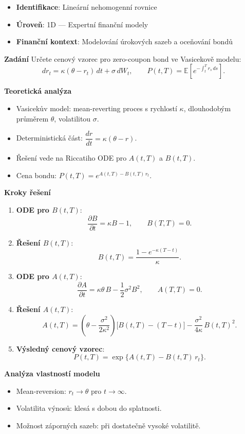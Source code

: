 \begin{example}
\label{ex:vasicek-model}

\begin{itemize}
\item \textbf{Identifikace}: Lineární nehomogenní rovnice
\item \textbf{Úroveň}: 1D — Expertní finanční modely
\item \textbf{Finanční kontext}: Modelování úrokových sazeb a oceňování bondů
\end{itemize}

\noindent\textbf{Zadání}
Určete cenový vzorec pro zero-coupon bond ve Vasicekově modelu:
\[
dr_t = \kappa(\theta - r_t)\,dt + \sigma\, dW_t,
\qquad
P(t,T) = \mathbb{E}\!\left[e^{-\int_t^T r_s\, ds}\right].
\]

\noindent\textbf{Teoretická analýza}
\begin{itemize}
\item Vasicekův model: mean-reverting proces s rychlostí $\kappa$, dlouhodobým průměrem $\theta$, volatilitou $\sigma$.
\item Deterministická část: $\dfrac{dr}{dt} = \kappa(\theta - r)$.
\item Řešení vede na Riccatiho ODE pro $A(t,T)$ a $B(t,T)$.
\item Cena bondu: $P(t,T) = e^{A(t,T) - B(t,T)\, r_t}$.
\end{itemize}

\noindent\textbf{Kroky řešení}
\begin{enumerate}
\item \textbf{ODE pro $B(t,T)$}:
\[
\frac{\partial B}{\partial t} = \kappa B - 1, \qquad B(T,T) = 0.
\]
\item \textbf{Řešení $B(t,T)$}:
\[
B(t,T) = \frac{1 - e^{-\kappa (T-t)}}{\kappa}.
\]
\item \textbf{ODE pro $A(t,T)$}:
\[
\frac{\partial A}{\partial t} = \kappa\theta\, B - \frac{1}{2}\sigma^2 B^2, 
\qquad A(T,T) = 0.
\]
\item \textbf{Řešení $A(t,T)$}:
\[
A(t,T) = \left(\theta - \frac{\sigma^2}{2\kappa^2}\right)\!\big[B(t,T) - (T-t)\big]
- \frac{\sigma^2}{4\kappa}\, B(t,T)^2.
\]
\item \textbf{Výsledný cenový vzorec}:
\[
P(t,T) = \exp\!\big\{A(t,T) - B(t,T)\, r_t\big\}.
\]
\end{enumerate}

\noindent\textbf{Analýza vlastností modelu}
\begin{itemize}
\item Mean-reversion: $r_t \to \theta$ pro $t \to \infty$.
\item Volatilita výnosů: klesá s dobou do splatnosti.
\item Možnost záporných sazeb: při dostatečně vysoké volatilitě.
\end{itemize}


\end{example}
